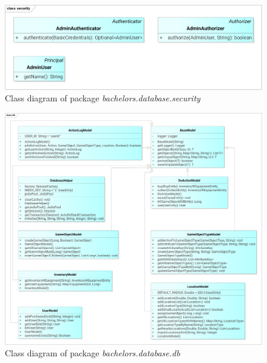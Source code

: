 \begin{figure}[h]	
	\includegraphics[width=\textwidth]{figures/classdiagrams/dssecurity}
	\centering			
	\caption{Class diagram of package \textit{bachelors.database.security}}
\end{figure}

\begin{figure}[h]	
	\includegraphics[width=\textwidth]{figures/classdiagrams/dsdb}
	\centering			
	\caption{Class diagram of package \textit{bachelors.database.db}}
\end{figure}

